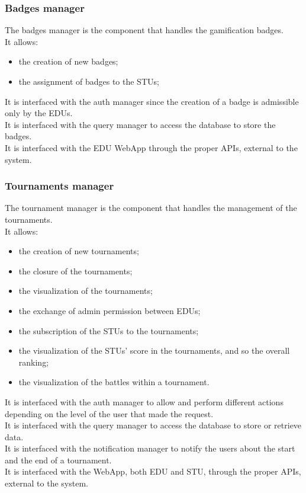 \subsubsection*{Badges manager}
The badges manager is the component that handles the gamification badges. \\
It allows:
\begin{itemize}
    \item the creation of new badges;
    \item the assignment of badges to the STUs;
\end{itemize}
It is interfaced with the auth manager since the creation of a badge is admissible only by the EDUs. \\
It is interfaced with the query manager to access the database to store the badges. \\
It is interfaced with the EDU WebApp through the proper APIs, external to the system.

\subsubsection*{Tournaments manager}
The tournament manager is the component that handles the management of the tournaments.\\
It allows:
\begin{itemize}
    \item the creation of new tournaments;
    \item the closure of the tournaments;
    \item the visualization of the tournaments;
    \item the exchange of admin permission between EDUs;
    \item the subscription of the STUs to the tournaments;
    \item the visualization of the STUs' score in the tournaments, and so the overall ranking;
    \item the visualization of the battles within a tournament.
\end{itemize}
It is interfaced with the auth manager to allow and perform different actions depending on the level of the user that made the request. \\
It is interfaced with the query manager to access the database to store or retrieve data. \\
It is interfaced with the notification manager to notify the users about the start and the end of a tournament.\\
It is interfaced with the WebApp, both EDU and STU, through the proper APIs, external to the system.

